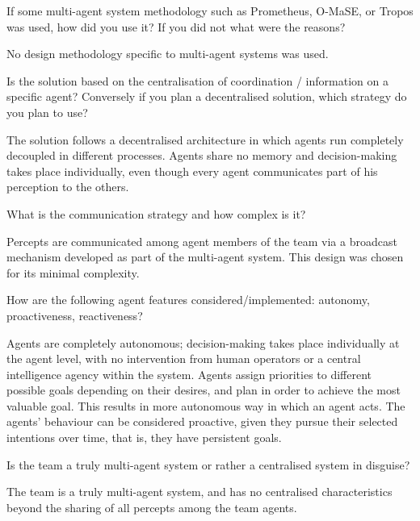 \begin{question}
If some multi-agent system methodology such as Prometheus, O-MaSE, or Tropos was
used, how did you use it? If you did not what were the reasons?  
\end{question}

No design methodology specific to multi-agent systems was used. 

\begin{question}
Is the solution based on the centralisation of coordination / information on
a specific agent? Conversely if you plan a decentralised solution, which
strategy do you plan to use?  
\end{question}

The solution follows a decentralised architecture in which agents run completely
decoupled in different processes. Agents share no memory and decision-making
takes place individually, even though every agent communicates part of his
perception to the others.

\begin{question}
What is the communication strategy and how complex is it?
\end{question}

Percepts are communicated among agent members of the team via a broadcast
mechanism developed as part of the multi-agent system. This design was chosen
for its minimal complexity.

\begin{question}
How are the following agent features considered/implemented: autonomy,
proactiveness, reactiveness?  
\end{question}

Agents are completely autonomous; decision-making takes place individually at
the agent level, with no intervention from human operators or a central
intelligence agency within the system. Agents assign priorities to different
possible goals depending on their desires, and plan in order to achieve the most
valuable goal. This results in more autonomous way in which an agent acts.  The
agents' behaviour can be considered proactive, given they pursue their selected
intentions over time, that is, they have persistent goals.

\begin{question}
Is the team a truly multi-agent system or rather a centralised system in
disguise?  
\end{question}

The team is a truly multi-agent system, and has no centralised characteristics
beyond the sharing of all percepts among the team agents.

